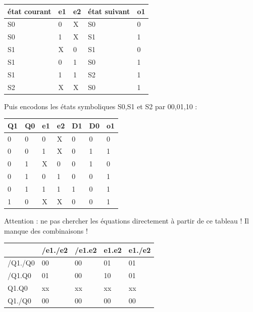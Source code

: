 \documentclass[a4paper,11pt]{article}
\begin{document}

\begin{table}[h!]
    \begin{tabular}{|l|l|l||l|l|}
        \hline
        état courant & e1 & e2 & état suivant  & o1 \\ \hline
        S0           & 0  & X  & S0            & 0  \\
        S0           & 1  & X  & S1            & 1  \\
        S1           & X  & 0  & S1            & 0  \\
        S1           & 0  & 1  & S0            & 1  \\
        S1           & 1  & 1  & S2            & 1  \\
        S2           & X  & X  & S0            & 1  \\
        \hline
    \end{tabular}
\end{table}

Puis encodons les états symboliques S0,S1 et S2 par 00,01,10 :
\begin{table}[h!]
    \begin{tabular}{|l|l|l|l||l|l|l|}
        \hline
        Q1 & Q0 & e1 & e2 & D1 & D0 & o1 \\ \hline
        0  & 0  & 0  & X  & 0  & 0  & 0  \\
        0  & 0  & 1  & X  & 0  & 1  & 1  \\
        0  & 1  & X  & 0  & 0  & 1  & 0  \\
        0  & 1  & 0  & 1  & 0  & 0  & 1  \\
        0  & 1  & 1  & 1  & 1  & 0  & 1  \\
        1  & 0  & X  & X  & 0  & 0  & 1  \\
        \hline
    \end{tabular}
\end{table}
Attention : ne pas chercher les équations directement à partir de ce tableau ! Il manque des combinaisons !

\begin{table}[h]
\begin{tabular}{|l|l|l|l|l|}
\hline
        & /e1./e2 & /e1.e2 & e1.e2 & e1./e2 \\ \hline
/Q1./Q0 & 00      & 00     & 01    & 01     \\ \hline
/Q1.Q0  & 01      & 00     & 10    & 01     \\ \hline
Q1.Q0   & xx      & xx     & xx    & xx     \\ \hline
Q1./Q0  & 00      & 00     & 00    & 00     \\ \hline
\end{tabular}
\end{table}
\end{document}
